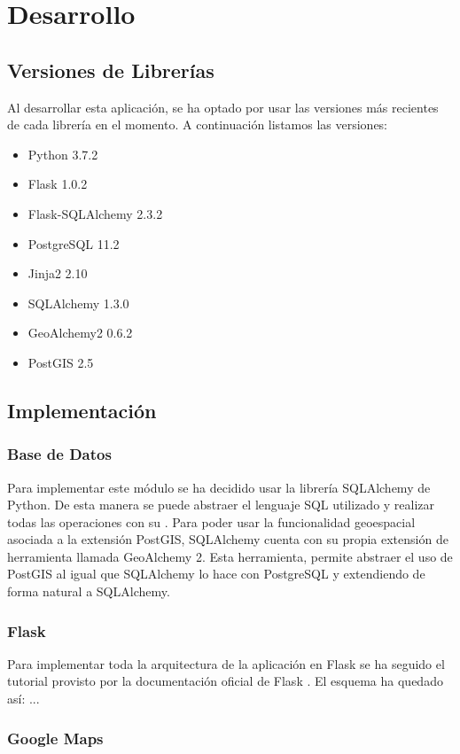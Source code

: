 \chapter{Desarrollo\label{CAP:DESARROLLO}}
  \section{Versiones de Librerías}
    Al desarrollar esta aplicación, se ha optado por usar las versiones más recientes de cada librería en el momento. A continuación listamos las versiones:
    \begin{itemize}
      \item Python 3.7.2
      \item Flask 1.0.2
      \item Flask-SQLAlchemy 2.3.2
      \item PostgreSQL 11.2
      \item Jinja2 2.10
      \item SQLAlchemy 1.3.0 
      \item GeoAlchemy2 0.6.2
      \item PostGIS 2.5
    \end{itemize}
  \section{Implementación}
    \subsection{Base de Datos}
      Para implementar este módulo se ha decidido usar la librería SQLAlchemy\cite{sqlalchemy} de Python. De esta manera se puede abstraer el lenguaje SQL utilizado y realizar todas las operaciones con su . 
      Para poder usar la funcionalidad geoespacial asociada a la extensión PostGIS, SQLAlchemy cuenta con su propia extensión de herramienta llamada GeoAlchemy 2\cite{geoalchemy}. Esta herramienta, permite abstraer el uso de PostGIS al igual que SQLAlchemy lo hace con PostgreSQL y extendiendo de forma natural a SQLAlchemy.
    \subsection{Flask}
      Para implementar toda la arquitectura de la aplicación en Flask se ha seguido el tutorial provisto por la documentación oficial de Flask \cite{flask}. El esquema ha quedado así:
      ...
    \subsection{Google Maps}
        
